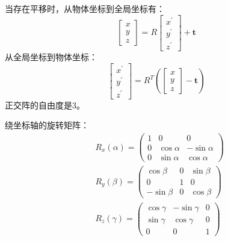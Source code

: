 \documentclass[lang=cn,newtx,10pt,scheme=chinese]{elegantbook}
\begin{document}
当存在平移时，从物体坐标到全局坐标有：
\begin{equation}
  \left[\begin{array}{l}
    x \\
    y \\
    z
  \end{array}\right]
  =R\left[\begin{array}{l}
    x^{\prime} \\
    y^{\prime} \\
    z^{\prime}
    \end{array}\right] + \boldsymbol{t}
\end{equation}
从全局坐标到物体坐标：
\begin{equation}
  \left[\begin{array}{l}
    x^{\prime} \\
    y^{\prime} \\
    z^{\prime}
  \end{array}\right]
  =R^{T}\left(\left[\begin{array}{l}
    x \\
    y \\
    z
    \end{array}\right] - \boldsymbol{t} \right)
\end{equation}
正交阵的自由度是3。

绕坐标轴的旋转矩阵：
\begin{equation}
  \begin{aligned}
  & R_x(\alpha)=\left(\begin{array}{ccc}
  1 & 0 & 0 \\
  0 & \cos \alpha & -\sin \alpha \\
  0 & \sin \alpha & \cos \alpha
  \end{array}\right) \\
  & R_y(\beta)=\left(\begin{array}{ccc}
  \cos \beta & 0 & \sin \beta \\
  0 & 1 & 0 \\
  -\sin \beta & 0 & \cos \beta
  \end{array}\right) \\
  & R_z(\gamma)=\left(\begin{array}{ccc}
  \cos \gamma & -\sin \gamma & 0 \\
  \sin \gamma & \cos \gamma & 0 \\
  0 & 0 & 1
  \end{array}\right)
  \end{aligned}
\end{equation}
\end{document}
